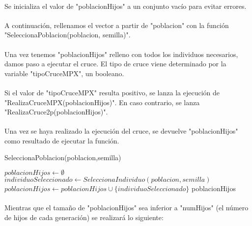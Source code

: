	\paragraph{}Se inicializa el valor de "poblacionHijos" a un conjunto vacío para evitar errores.
	
	\paragraph{}A continuación, rellenamos el vector a partir de "poblacion" con la función "SeleccionaPoblacion(poblacion, semilla)".
	
	\paragraph{}Una vez tenemos "poblacionHijos" relleno con todos los individuos necesarios, damos paso a ejecutar el cruce. El tipo de cruce viene determinado por la variable "tipoCruceMPX", un booleano.
	
	\paragraph{}Si el valor de "tipoCruceMPX" resulta positivo, se lanza la ejecución de "RealizaCruceMPX(poblacionHijos)". En caso contrario, se lanza "RealizaCruce2p(poblacionHijos)".
	
	\paragraph{} Una vez se haya realizado la ejecución del cruce, se devuelve "poblacionHijos" como resultado de ejecutar la función.

	\begin{algorithm}[H]
		\caption{SeleccionaPoblacion(poblacion,semilla)}
		\begin{algorithmic}
			\STATE $poblacionHijos \leftarrow \emptyset$
			\STATE $individuoSeleccionado \leftarrow SeleccionaIndividuo(poblacion,semilla)$
			\STATE $poblacionHijos \leftarrow poblacionHijos\cup\{individuoSeleccionado\}$
			\ENDWHILE
			\RETURN poblacionHijos
		\end{algorithmic}
	\end{algorithm}

	\paragraph{}Mientras que el tamaño de "poblacionHijos" sea inferior a "numHijos" (el número de hijos de cada generación) se realizará lo siguiente:
	
